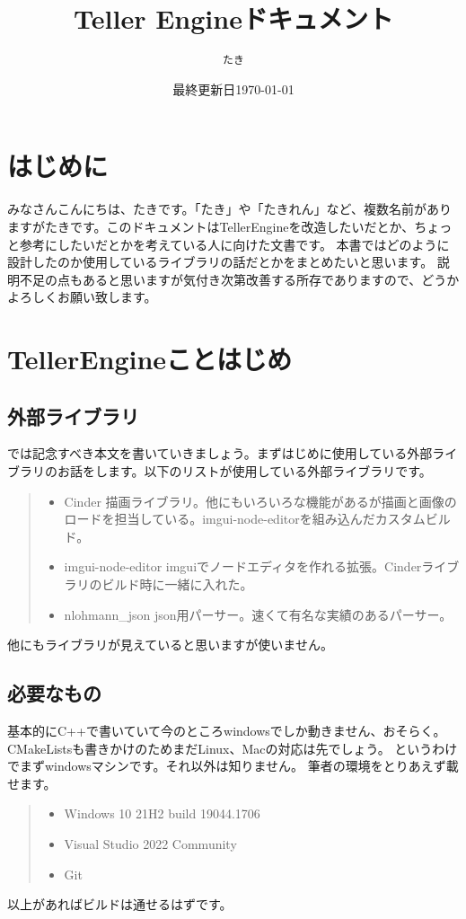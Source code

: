 \documentclass[12pt,a4j,uplatex]{jsarticle}
\begin{document}
\title{Teller Engineドキュメント}
\author{\texttt{たき}}
\date{最終更新日\today}

\maketitle
\section*{はじめに}
みなさんこんにちは、たきです。「たき」や「たきれん」など、複数名前がありますがたきです。このドキュメントはTellerEngineを改造したいだとか、ちょっと参考にしたいだとかを考えている人に向けた文書です。
本書ではどのように設計したのか使用しているライブラリの話だとかをまとめたいと思います。
説明不足の点もあると思いますが気付き次第改善する所存でありますので、どうかよろしくお願い致します。
\newpage
\tableofcontents
\newpage
\section{TellerEngineことはじめ}
\subsection{外部ライブラリ}
では記念すべき本文を書いていきましょう。まずはじめに使用している外部ライブラリのお話をします。以下のリストが使用している外部ライブラリです。

\begin{quote}
  \begin{itemize}
    \item Cinder 描画ライブラリ。他にもいろいろな機能があるが描画と画像のロードを担当している。imgui-node-editorを組み込んだカスタムビルド。
    \item imgui-node-editor imguiでノードエディタを作れる拡張。Cinderライブラリのビルド時に一緒に入れた。
    \item nlohmann\_json json用パーサー。速くて有名な実績のあるパーサー。
  \end{itemize}
\end{quote}
他にもライブラリが見えていると思いますが使いません。
\subsection{必要なもの}
基本的にC++で書いていて今のところwindowsでしか動きません、おそらく。CMakeListsも書きかけのためまだLinux、Macの対応は先でしょう。
というわけでまずwindowsマシンです。それ以外は知りません。
筆者の環境をとりあえず載せます。
\begin{quote}
  \begin{itemize}
    \item Windows 10 21H2 build 19044.1706
    \item Visual Studio 2022 Community
    \item Git
  \end{itemize}
\end{quote}
以上があればビルドは通せるはずです。
\end{document}
